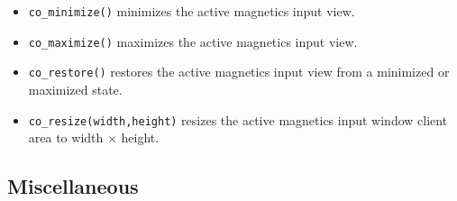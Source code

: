 \begin{itemize}
\item{\tt co\_minimize()} minimizes the active magnetics input view.

\item{\tt co\_maximize()} maximizes the active magnetics input view.

\item{\tt co\_restore()} restores the active magnetics input view from a
 minimized or maximized state.

\item{\tt co\_resize(width,height)} resizes the active magnetics input
 window client area to width $\times$ height.

\end{itemize}

\subsection{Miscellaneous}

